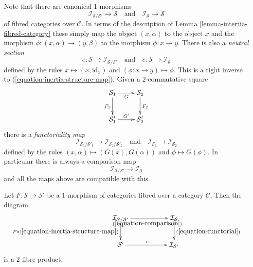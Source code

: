 \noindent
Note that there are canonical $1$-morphisms
\begin{equation}
\label{equation-inertia-structure-map}
\mathcal{I}_{\mathcal{S}/\mathcal{S}'} \longrightarrow \mathcal{S}
\quad\text{and}\quad
\mathcal{I}_\mathcal{S} \longrightarrow \mathcal{S}
\end{equation}
of fibred categories over $\mathcal{C}$. In terms of the description of
Lemma \ref{lemma-intertia-fibred-category}
these simply map the object $(x, \alpha)$ to the object $x$ and the morphism
$\phi : (x, \alpha) \to (y, \beta)$ to the morphism $\phi : x \to y$.
There is also a {\it neutral section}
\begin{equation}
\label{equation-neutral-section}
e : \mathcal{S} \to \mathcal{I}_{\mathcal{S}/\mathcal{S}'}
\quad\text{and}\quad
e : \mathcal{S} \to \mathcal{I}_{\mathcal{S}}
\end{equation}
defined by the rules $x \mapsto (x, \text{id}_x)$ and
$(\phi : x \to y) \mapsto \phi$. This is a right inverse to
(\ref{equation-inertia-structure-map}). Given a $2$-commutative
square
$$
\xymatrix{
\mathcal{S}_1 \ar[d]_{F_1} \ar[r]_G & \mathcal{S}_2 \ar[d]^{F_2} \\
\mathcal{S}'_1 \ar[r]^{G'} & \mathcal{S}'_2
}
$$
there is a {\it functoriality map}
\begin{equation}
\label{equation-functorial}
\mathcal{I}_{\mathcal{S}_1/\mathcal{S}'_1}
\longrightarrow
\mathcal{I}_{\mathcal{S}_2/\mathcal{S}'_2}
\quad\text{and}\quad
\mathcal{I}_{\mathcal{S}_1}
\longrightarrow
\mathcal{I}_{\mathcal{S}_2}
\end{equation}
defined by the rules $(x, \alpha) \mapsto (G(x), G(\alpha))$
and $\phi \mapsto G(\phi)$. In particular there is always a
comparison map
\begin{equation}
\label{equation-comparison}
\mathcal{I}_{\mathcal{S}/\mathcal{S}'}
\longrightarrow
\mathcal{I}_{\mathcal{S}}
\end{equation}
and all the maps above are compatible with this.

\begin{lemma}
\label{lemma-relative-inertia-as-fibre-product}
Let $F : \mathcal{S} \to \mathcal{S}'$ be a $1$-morphism of categories
fibred over a category $\mathcal{C}$. Then the diagram
$$
\xymatrix{
\mathcal{I}_{\mathcal{S}/\mathcal{S}'}
\ar[d]_{F \circ (\ref{equation-inertia-structure-map})}
\ar[rr]_{(\ref{equation-comparison})} & &
\mathcal{I}_{\mathcal{S}} \ar[d]^{(\ref{equation-functorial})} \\
\mathcal{S}' \ar[rr]^e & &
\mathcal{I}_{\mathcal{S}'}
}
$$
is a $2$-fibre product.
\end{lemma}

